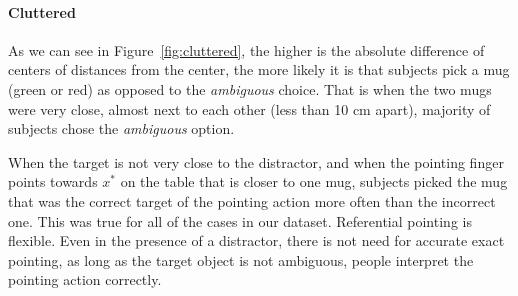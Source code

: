 \paragraph{Cluttered}

As we can see in Figure~\ref{fig:cluttered}, the higher is the absolute difference of centers of distances from the center, the more likely it is that subjects pick a mug (green or red) as opposed to the \textit{ambiguous} choice. That is when the two mugs were very close, almost next to each other (less than 10 cm apart), majority of subjects chose the \textit{ambiguous} option. 
 


When the target is not very close to the distractor, and when the pointing finger points towards $x^*$ on the table that is closer to one mug, subjects picked the mug that was the correct target of the pointing action more often than the incorrect one. This was true for all of the cases in our dataset. Referential pointing is flexible. Even in the presence of a distractor, there is not need for accurate exact pointing, as long as the target object is not ambiguous, people interpret the pointing action correctly.

